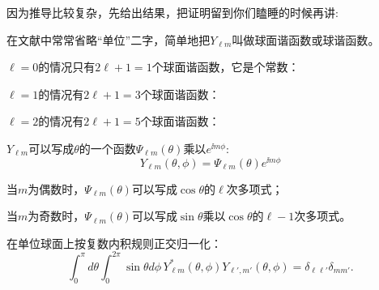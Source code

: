 \documentclass[CJK]{beamer}
\begin{document}
\begin{frame}
\bch
因为推导比较复杂，先给出结果，把证明留到你们瞌睡的时候再讲:
\skiplines
{}

在文献中常常省略“单位”二字，简单地把$Y_{\ell m}$叫做{\blue 球面谐函数}或{\blue 球谐函数}。

\ech
\end{frame}




\begin{frame}
\bch
$\ell = 0$的情况只有$2\ell+1=1$个球面谐函数，它是个常数：


\ech
\end{frame}



\begin{frame}
\bch
$\ell = 1$的情况有$2\ell+1=3$个球面谐函数：

\ech
\end{frame}

\begin{frame}
\bch
$\ell = 2$的情况有$2\ell+1=5$个球面谐函数：

\ech
\end{frame}


\begin{frame}
\bch
\bitem
\item{$Y_{\ell m}$可以写成$\theta$的一个函数$\Psi_{\ell m}(\theta)$乘以$e^{\ii m\phi}$:
  {\blue $$Y_{\ell m}(\theta,\phi) = \Psi_{\ell m}(\theta)e^{\ii m\phi}$$}
  \bitem
\item{\blue 当$m$为偶数时，$\Psi_{\ell m}(\theta)$可以写成$\cos\theta$的$\ell$次多项式；}
\item{\blue 当$m$为奇数时，$\Psi_{\ell m}(\theta)$可以写成$\sin\theta$乘以$\cos\theta$的$\ell-1$次多项式。}
  \eitem}
\item{在单位球面上按复数内积规则正交归一化：
  {\blue $$\int_0^\pi d\theta\int_0^{2\pi}\sin\theta d\phi \, Y_{\ell m}^*(\theta,\phi)Y_{\ell',m'}(\theta,\phi) = \delta_{\ell\ell'}\delta_{m m'} .$$}}  
  \eitem

\ech
\end{frame}
\end{document}
